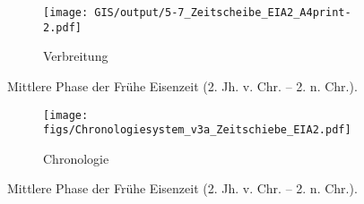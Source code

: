 \begin{figure*}[p]
	\centering
	\begin{subfigure}[b]{\textwidth}
		\centering
		\texttt{[image: GIS/output/5-7\_Zeitscheibe\_EIA2\_A4print-2.pdf]}
		\vspace{2cm}
		\caption{Verbreitung}
		\label{fig:EIA2_Karte}
	\end{subfigure}
	\caption{Mittlere Phase der Frühe Eisenzeit (2. Jh. v. Chr. -- 2. n. Chr.).}
	\label{}
\end{figure*}
\addtocounter{figure}{-1}
\begin{figure*}[p]
	\begin{subfigure}[b]{\textwidth}
		\setcounter{subfigure}{1}
		\centering
		\texttt{[image: figs/Chronologiesystem\_v3a\_Zeitschiebe\_EIA2.pdf]}
		\caption{Chronologie}
		\label{fig:EIA2_Chronologie}
	\end{subfigure}
	\caption{Mittlere Phase der Frühe Eisenzeit (2. Jh. v. Chr. -- 2. n. Chr.).}
	\label{fig:EIA2}
\end{figure*}


